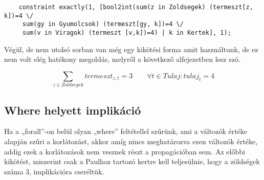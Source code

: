\documentclass[12pt,a4paper,twoside, openright]{report}
\begin{document}
    \begin{lstlisting}
    constraint exactly(1, [bool2int(sum(z in Zoldsegek) (termeszt[z, k])=4 \/ 
     sum(gy in Gyumolcsok) (termeszt[gy, k])=4 \/ 
     sum(v in Viragok) (termeszt [v,k])=4) | k in Kertek], 1); \end{lstlisting}

    Végül, de nem utolsó sorban van még egy kikötési forma amit használtunk, de ez nem volt elég hatékony megoldás, melyről a következő alfejezetben lesz szó.

    \begin{equation}
        \sum_{z\in Zoldsegek} termeszt_{z,t} = 3 \qquad \forall t\in Tulaj: tulaj_{t} = 4
    \end{equation}
    

\subsection{Where helyett implikáció}

    Ha a „forall”-on belül olyan „where” feltétellel szűrünk, ami a változók értéke alapján szűri a korlátozást, akkor amíg nincs meghatározva ezen változók értéke, addig ezek a korlátozások nem vesznek részt a propagációban sem.
    Az előbbi kikötést, miszerint csak a Paulhoz tartozó kertre kell teljesülnie, hogy a zöldségek száma 3, implikációra cseréltük.
\end{document}
